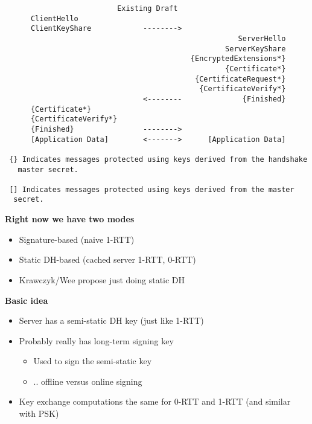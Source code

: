\documentclass[helvetica]{seminar}
\newcommand{\heading}[1]{%
  \begin{center} 
    \large\bf 
    #1 
  \end{center} 
  \vspace{.4 in}}
\begin{document}
\begin{slide}
\begin{footnotesize}
\begin{verbatim}
                          Existing Draft
      ClientHello
      ClientKeyShare            -------->
                                                      ServerHello
                                                   ServerKeyShare
                                           {EncryptedExtensions*}
                                                   {Certificate*}
                                            {CertificateRequest*}
                                             {CertificateVerify*}
                                <--------              {Finished}
      {Certificate*}
      {CertificateVerify*}
      {Finished}                -------->
      [Application Data]        <------->      [Application Data]

 {} Indicates messages protected using keys derived from the handshake
   master secret.

 [] Indicates messages protected using keys derived from the master
  secret.
\end{verbatim}
\end{footnotesize}
\end{slide}

\begin{slide}
\heading{Right now we have two modes}

\begin{itemize}
\item Signature-based (naive 1-RTT)
\item Static DH-based (cached server 1-RTT, 0-RTT)
\item Krawczyk/Wee propose just doing static DH
\end{itemize}
\end{slide}


\begin{slide}
\heading{Basic idea}

\begin{itemize}
\item Server has a semi-static DH key (just like 1-RTT)
\item Probably really has long-term signing key
  \begin{itemize}
  \item Used to sign the semi-static key
  \item .. offline versus online signing
  \end{itemize}

\item Key exchange computations the same for 0-RTT and 1-RTT (and similar with PSK)
\end{itemize}

\end{slide}
\end{document}
